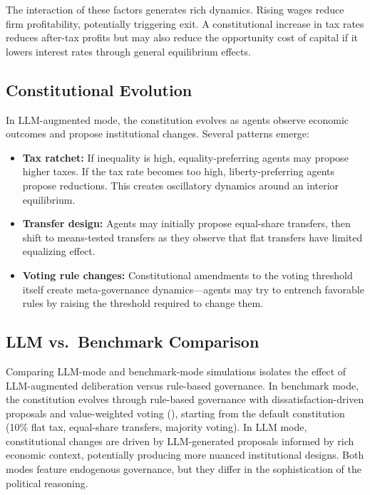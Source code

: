 \documentclass[12pt]{article}
\begin{document}
The interaction of these factors generates rich dynamics. Rising wages reduce firm profitability, potentially triggering exit. A constitutional increase in tax rates reduces after-tax profits but may also reduce the opportunity cost of capital if it lowers interest rates through general equilibrium effects.


\subsection{Constitutional Evolution}

In LLM-augmented mode, the constitution evolves as agents observe economic outcomes and propose institutional changes. Several patterns emerge:
\begin{itemize}
  \item \textbf{Tax ratchet:} If inequality is high, equality-preferring agents may propose higher taxes. If the tax rate becomes too high, liberty-preferring agents propose reductions. This creates oscillatory dynamics around an interior equilibrium.
  \item \textbf{Transfer design:} Agents may initially propose equal-share transfers, then shift to means-tested transfers as they observe that flat transfers have limited equalizing effect.
  \item \textbf{Voting rule changes:} Constitutional amendments to the voting threshold itself create meta-governance dynamics---agents may try to entrench favorable rules by raising the threshold required to change them.
\end{itemize}


\subsection{LLM vs.\ Benchmark Comparison}

Comparing LLM-mode and benchmark-mode simulations isolates the effect of LLM-augmented deliberation versus rule-based governance. In benchmark mode, the constitution evolves through rule-based governance with dissatisfaction-driven proposals and value-weighted voting (), starting from the default constitution (10\% flat tax, equal-share transfers, majority voting). In LLM mode, constitutional changes are driven by LLM-generated proposals informed by rich economic context, potentially producing more nuanced institutional designs. Both modes feature endogenous governance, but they differ in the sophistication of the political reasoning.
\end{document}
